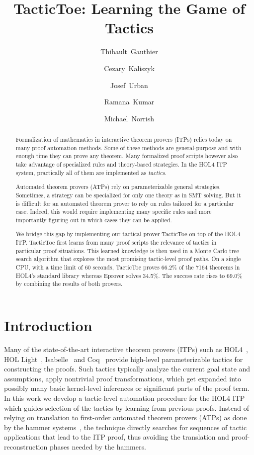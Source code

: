 \documentclass[runningheads,a4paper,draft]{svjour3}
\title{TacticToe: Learning the Game of Tactics}
\author{\mbox{Thibault Gauthier} \and \mbox{Cezary Kaliszyk} \and \mbox{Josef
Urban} \and \mbox{Ramana Kumar} \and \mbox{Michael Norrish}}
\institute{Thibault Gauthier and Cezary Kaliszyk \at
Department of Computer Science, University of Innsbruck,
Innsbruck, Austria\\ \url{{thibault.gauthier,cezary.kaliszyk}@uibk.ac.at}
\and
Josef Urban \at Czech Technical University, Prague\\\url{josef.urban@gmail.com}
\and Ramana Kumar and Michael Norrish \at Data61}
\newcommand{\todoi}[1]{\todo[inline]{#1}}
\def\holfour{\textsf{HOL4}\xspace}
\def\isabelle{\textsf{Isabelle}\xspace}
\def\hollight{\textsf{HOL Light}\xspace}
\def\coq{\textsf{Coq}\xspace}
\begin{document}
\maketitle

\begin{abstract}
Formalization of mathematics in interactive theorem provers (ITPs)
relies today on many proof automation methods.
Some of these methods are general-purpose and with enough time they can prove any
theorem. Many formalized proof scripts however also
take advantage of specialized rules and theory-based strategies.
In the HOL4 ITP system, practically all of them are implemented as \emph{tactics}.

Automated theorem provers (ATPs) rely on parameterizable general
strategies. Sometimes, a strategy can be specialized for only one theory as in
SMT solving. But it is difficult for an automated theorem prover to rely on
rules tailored for a particular case.
Indeed, this would require implementing many specific rules and more
importantly figuring out in which cases they can be applied.

We bridge this gap by implementing our tactical prover TacticToe on top
of the HOL4 ITP.
TacticToe first learns from many proof scripts
the relevance of tactics in particular proof situations.
This learned knowledge is then used in a Monte Carlo tree search algorithm that explores the most promising tactic-level proof paths.
On a single CPU, with a time limit of 60 seconds, TacticToe proves 66.2\%
of the 7164 theorems in HOL4's standard library whereas
Eprover solves 34.5\%. The success rate rises to 69.0\% by combining the
results of both provers.
\end{abstract}

\section{Introduction}
\tableofcontents

\todoi{Comparison with hammers in usability}
Many of the state-of-the-art interactive theorem provers (ITPs) such as
  \holfour~\cite{hol4}, \hollight~\cite{Harrison09hollight},
  \isabelle~\cite{isabelle}
  and \coq~\cite{coq-book}
  provide high-level parameterizable tactics for constructing the
  proofs.  Such tactics typically analyze the current goal state and
  assumptions, apply nontrivial proof transformations, which get
  expanded into possibly many basic kernel-level inferences or significant
  parts of the proof term.
  In this
  work we develop a tactic-level automation procedure for the \holfour ITP
  which guides selection of the tactics by learning from previous
  proofs.  Instead of relying on translation to first-order automated
  theorem provers (ATPs) as done by the hammer
  systems~\cite{hammers4qed,tgck-cpp15}, the technique
  directly searches for sequences of tactic applications that lead to
  the ITP proof, thus avoiding the translation and
  proof-reconstruction phases needed by the hammers.
\end{document}
